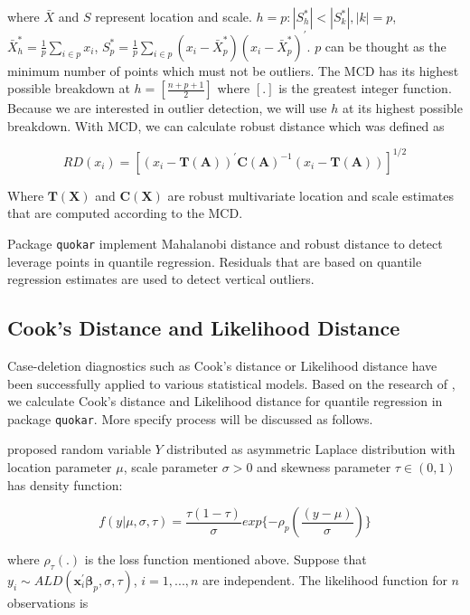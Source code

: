\documentclass[article]{jss}
\theoremstyle{definition}
\theoremstyle{definition}
\theoremstyle{remark}
\begin{document}
where \(\bar{X}\) and \(S\) represent location and scale.
\(h={p: |S^{*}_{h}|<|S^{*}_{k}|,|k|=p}\),
\(\bar{X}^{*}_{h}=\frac{1}{p}\sum_{i \in p}x_{i}\),
\(S^{*}_{p}=\frac{1}{p}\sum_{i \in p}(x_i-\bar{X}^{*}_{p})(x_i-\bar{X}^{*}_{p})^{'}\).
\(p\) can be thought as the minimum number of points which must not be
outliers. The MCD has its highest possible breakdown at
\(h=[\frac{n+p+1}{2}]\) where \([.]\) is the greatest integer function.
Because we are interested in outlier detection, we will use \(h\) at its
highest possible breakdown. With MCD, we can calculate robust distance
which was defined as

\begin{equation}
RD(x_i)=[(x_i-\boldsymbol{T(A)})^{'}\boldsymbol{C(A)}^{-1}(x_i-\boldsymbol{T(A)})]^{1/2}
\label{eq:rd}
\end{equation}

Where \(\boldsymbol{T(X)}\) and \(\boldsymbol{C(X)}\) are robust
multivariate location and scale estimates that are computed according to
the MCD.

Package \texttt{quokar} implement Mahalanobi distance and robust
distance to detect leverage points in quantile regression. Residuals
that are based on quantile regression estimates are used to detect
vertical outliers.

\subsection{Cook's Distance and Likelihood
Distance}\label{cooks-distance-and-likelihood-distance}

Case-deletion diagnostics such as Cook's distance or Likelihood distance
have been successfully applied to various statistical models. Based on
the research of \citet{sanchez2013likelihood}, we calculate Cook's
distance and Likelihood distance for quantile regression in package
\texttt{quokar}. More specify process will be discussed as follows.

\citet{yu2001bayesian} proposed random variable \(Y\) distributed as
asymmetric Laplace distribution with location parameter \(\mu\), scale
parameter \(\sigma >0\) and skewness parameter \(\tau \in (0,1)\) has
density function:

\begin{equation}
f(y|\mu, \sigma, \tau) = \frac{\tau (1-\tau)}{\sigma}exp\{-\rho_{p}(\frac{(y-\mu)}{\sigma})\}
\label{eq: ald}
\end{equation}

where \(\rho_{\tau}(.)\) is the loss function mentioned above. Suppose
that
\(y_i \sim ALD(\boldsymbol{x}^{'}_{i}\mathbf{\beta}_{p}, \sigma, \tau)\),
\(i=1,...,n\) are independent. The likelihood function for \(n\)
observations is
\end{document}
